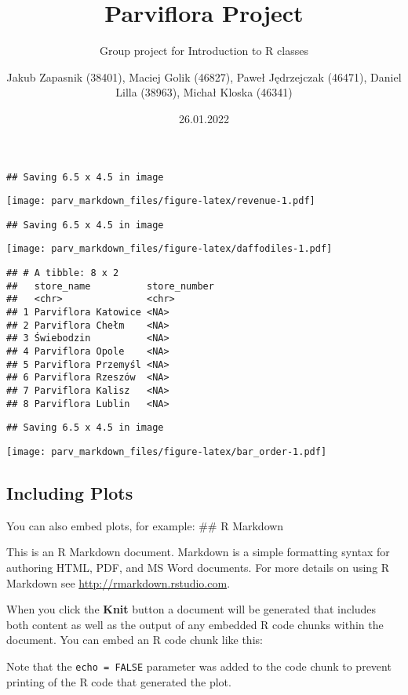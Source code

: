 \documentclass[
]{article}
\title{Parviflora Project}
\subtitle{Group project for Introduction to R classes}
\author{Jakub Zapasnik (38401), Maciej Golik (46827), Paweł Jędrzejczak
(46471), Daniel Lilla (38963), Michał Kloska (46341)}
\date{26.01.2022}
\begin{document}
\maketitle

\begin{verbatim}
## Saving 6.5 x 4.5 in image
\end{verbatim}

\texttt{[image: parv\_markdown\_files/figure-latex/revenue-1.pdf]}

\begin{verbatim}
## Saving 6.5 x 4.5 in image
\end{verbatim}

\texttt{[image: parv\_markdown\_files/figure-latex/daffodiles-1.pdf]}

\begin{verbatim}
## # A tibble: 8 x 2
##   store_name          store_number
##   <chr>               <chr>       
## 1 Parviflora Katowice <NA>        
## 2 Parviflora Chełm    <NA>        
## 3 Świebodzin          <NA>        
## 4 Parviflora Opole    <NA>        
## 5 Parviflora Przemyśl <NA>        
## 6 Parviflora Rzeszów  <NA>        
## 7 Parviflora Kalisz   <NA>        
## 8 Parviflora Lublin   <NA>
\end{verbatim}

\begin{verbatim}
## Saving 6.5 x 4.5 in image
\end{verbatim}

\texttt{[image: parv\_markdown\_files/figure-latex/bar\_order-1.pdf]}

\hypertarget{including-plots}{%
\subsection{Including Plots}\label{including-plots}}

You can also embed plots, for example: \#\# R Markdown

This is an R Markdown document. Markdown is a simple formatting syntax
for authoring HTML, PDF, and MS Word documents. For more details on
using R Markdown see \url{http://rmarkdown.rstudio.com}.

When you click the \textbf{Knit} button a document will be generated
that includes both content as well as the output of any embedded R code
chunks within the document. You can embed an R code chunk like this:

Note that the \texttt{echo\ =\ FALSE} parameter was added to the code
chunk to prevent printing of the R code that generated the plot.
\end{document}
